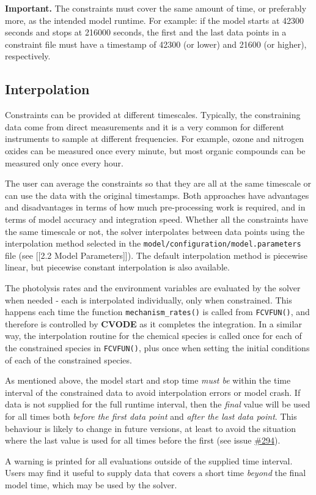 \textbf{Important.} The constraints must cover the same amount of time,
or preferably more, as the intended model runtime. For example: if the
model starts at 42300 seconds and stops at 216000 seconds, the first and
the last data points in a constraint file must have a timestamp of 42300
(or lower) and 21600 (or higher), respectively.

\hypertarget{interpolation}{%
\subsection{Interpolation}\label{interpolation}}

Constraints can be provided at different timescales. Typically, the
constraining data come from direct measurements and it is a very common
for different instruments to sample at different frequencies. For
example, ozone and nitrogen oxides can be measured once every minute,
but most organic compounds can be measured only once every hour.

The user can average the constraints so that they are all at the same
timescale or can use the data with the original timestamps. Both
approaches have advantages and disadvantages in terms of how much
pre-processing work is required, and in terms of model accuracy and
integration speed. Whether all the constraints have the same timescale
or not, the solver interpolates between data points using the
interpolation method selected in the
\texttt{model/configuration/model.parameters} file (see {[}{[}2.2 Model
Parameters{]}{]}). The default interpolation method is piecewise linear,
but piecewise constant interpolation is also available.

The photolysis rates and the environment variables are evaluated by the
solver when needed - each is interpolated individually, only when
constrained. This happens each time the function
\texttt{mechanism\_rates()} is called from \texttt{FCVFUN()}, and
therefore is controlled by \textbf{CVODE} as it completes the
integration. In a similar way, the interpolation routine for the
chemical species is called once for each of the constrained species in
\texttt{FCVFUN()}, plus once when setting the initial conditions of each
of the constrained species.

As mentioned above, the model start and stop time \emph{must be} within
the time interval of the constrained data to avoid interpolation errors
or model crash. If data is not supplied for the full runtime interval,
then the \emph{final} value will be used for all times both \emph{before
the first data point} and \emph{after the last data point}. This
behaviour is likely to change in future versions, at least to avoid the
situation where the last value is used for all times before the first
(see issue \href{https://github.com/AtChem/AtChem2/issues/294}{\#294}).

A warning is printed for all evaluations outside of the supplied time
interval. Users may find it useful to supply data that covers a short
time \emph{beyond} the final model time, which may be used by the
solver.
